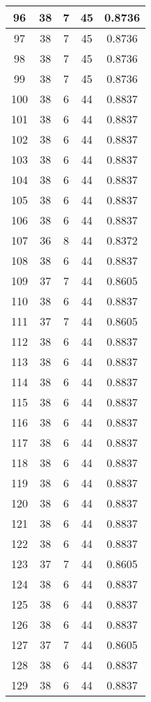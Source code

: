 \documentclass[letterpaper, 12pt]{article}
\begin{document}
\begin{longtable}{|c|c|c|c|c|}
\hline
96 & 38 & 7 & 45 & 0.8736 \\
\hline
97 & 38 & 7 & 45 & 0.8736 \\
\hline
98 & 38 & 7 & 45 & 0.8736 \\
\hline
99 & 38 & 7 & 45 & 0.8736 \\
\hline
100 & 38 & 6 & 44 & 0.8837 \\
\hline
101 & 38 & 6 & 44 & 0.8837 \\
\hline
102 & 38 & 6 & 44 & 0.8837 \\
\hline
103 & 38 & 6 & 44 & 0.8837 \\
\hline
104 & 38 & 6 & 44 & 0.8837 \\
\hline
105 & 38 & 6 & 44 & 0.8837 \\
\hline
106 & 38 & 6 & 44 & 0.8837 \\
\hline
107 & 36 & 8 & 44 & 0.8372 \\
\hline
108 & 38 & 6 & 44 & 0.8837 \\
\hline
109 & 37 & 7 & 44 & 0.8605 \\
\hline
110 & 38 & 6 & 44 & 0.8837 \\
\hline
111 & 37 & 7 & 44 & 0.8605 \\
\hline
112 & 38 & 6 & 44 & 0.8837 \\
\hline
113 & 38 & 6 & 44 & 0.8837 \\
\hline
114 & 38 & 6 & 44 & 0.8837 \\
\hline
115 & 38 & 6 & 44 & 0.8837 \\
\hline
116 & 38 & 6 & 44 & 0.8837 \\
\hline
117 & 38 & 6 & 44 & 0.8837 \\
\hline
118 & 38 & 6 & 44 & 0.8837 \\
\hline
119 & 38 & 6 & 44 & 0.8837 \\
\hline
120 & 38 & 6 & 44 & 0.8837 \\
\hline
121 & 38 & 6 & 44 & 0.8837 \\
\hline
122 & 38 & 6 & 44 & 0.8837 \\
\hline
123 & 37 & 7 & 44 & 0.8605 \\
\hline
124 & 38 & 6 & 44 & 0.8837 \\
\hline
125 & 38 & 6 & 44 & 0.8837 \\
\hline
126 & 38 & 6 & 44 & 0.8837 \\
\hline
127 & 37 & 7 & 44 & 0.8605 \\
\hline
128 & 38 & 6 & 44 & 0.8837 \\
\hline
129 & 38 & 6 & 44 & 0.8837 \\

\end{longtable}
\end{document}
